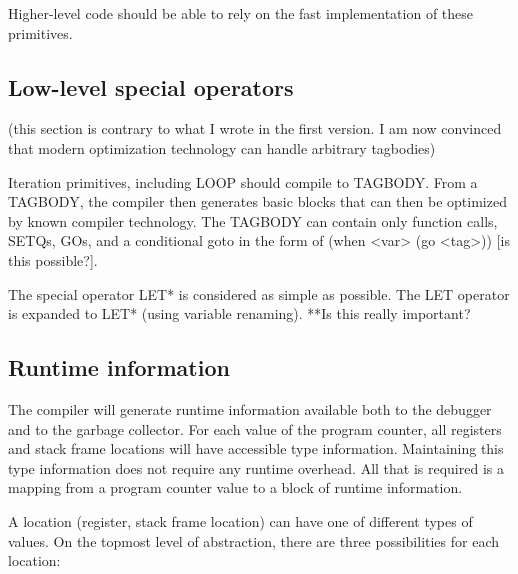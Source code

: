 \documentclass{article}
\begin{document}
Higher-level code should be able to rely on the fast implementation of
these primitives. 

\subsection{Low-level special operators}

(this section is contrary to what I wrote in the first version.  I am
now convinced that modern optimization technology can handle arbitrary
tagbodies)

Iteration primitives, including LOOP should compile to TAGBODY.  From
a TAGBODY, the compiler then generates basic blocks that can then be
optimized by known compiler technology.  The TAGBODY can contain only
function calls, SETQs, GOs, and a conditional goto in the form of
(when <var> (go <tag>)) [is this possible?].

The special operator LET* is considered as simple as possible.  The
LET operator is expanded to LET* (using variable renaming).  **Is this
really important?

\subsection{Runtime information}

The compiler will generate runtime information available both to the
debugger and to the garbage collector.  For each value of the program
counter, all registers and stack frame locations will have accessible
type information.  Maintaining this type information does not require
any runtime overhead.  All that is required is a mapping from a
program counter value to a block of runtime information. 

A location (register, stack frame location) can have one of different
types of values.  On the topmost level of abstraction, there are three
possibilities for each location:
\end{document}
